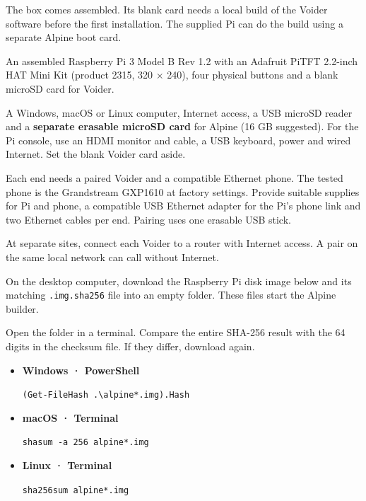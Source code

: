 The box comes assembled. Its blank card needs a local build of the Voider software before the first installation. The supplied Pi can do the build using a separate Alpine boot card.
\emergency
{}

An assembled Raspberry Pi 3 Model B Rev 1.2 with an Adafruit PiTFT 2.2-inch HAT Mini Kit (product 2315, 320 × 240), four physical buttons and a blank microSD card for Voider.

A Windows, macOS or Linux computer, Internet access, a USB microSD reader and a \textbf{separate erasable microSD card} for Alpine (16 GB suggested). For the Pi console, use an HDMI monitor and cable, a USB keyboard, power and wired Internet. Set the blank Voider card aside.

Each end needs a paired Voider and a compatible Ethernet phone. The tested phone is the Grandstream GXP1610 at factory settings. Provide suitable supplies for Pi and phone, a compatible USB Ethernet adapter for the Pi's phone link and two Ethernet cables per end. Pairing uses one erasable USB stick.

At separate sites, connect each Voider to a router with Internet access. A pair on the same local network can call without Internet.

On the desktop computer, download the Raspberry Pi disk image below and its matching \texttt{.img.sha256} file into an empty folder. These files start the Alpine builder.

\alpineSource

\alpineFile

Open the folder in a terminal. Compare the entire SHA-256 result with the 64 digits in the checksum file. If they differ, download again.
\begin{itemize}
\item \textbf{Windows · PowerShell}\par\verb|(Get-FileHash .\alpine*.img).Hash|
\item \textbf{macOS · Terminal}\par\verb|shasum -a 256 alpine*.img|
\item \textbf{Linux · Terminal}\par\verb|sha256sum alpine*.img|
\end{itemize}

